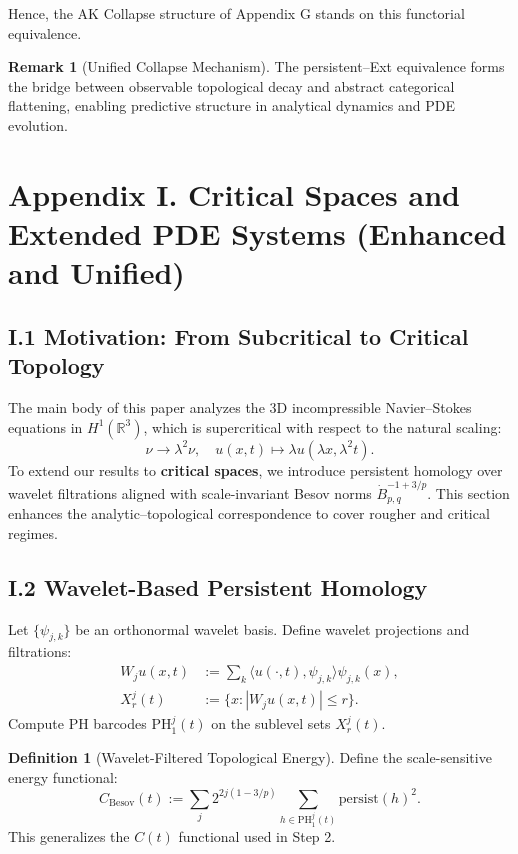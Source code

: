\documentclass[11pt]{article}
\theoremstyle{definition}
\newtheorem{definition}[theorem]{Definition}
\newtheorem{remark}[theorem]{Remark}
\begin{document}
Hence, the AK Collapse structure of Appendix G stands on this functorial equivalence.

\begin{remark}[Unified Collapse Mechanism]
The persistent–Ext equivalence forms the bridge between observable topological decay and abstract categorical flattening,  
enabling predictive structure in analytical dynamics and PDE evolution.
\end{remark}


\section*{Appendix I. Critical Spaces and Extended PDE Systems (Enhanced and Unified)}

\subsection*{I.1 Motivation: From Subcritical to Critical Topology}
The main body of this paper analyzes the 3D incompressible Navier--Stokes equations in $H^1(\mathbb{R}^3)$, which is supercritical with respect to the natural scaling:
\[
\nu \to \lambda^2 \nu, \quad u(x,t) \mapsto \lambda u(\lambda x, \lambda^2 t).
\]
To extend our results to \textbf{critical spaces}, we introduce persistent homology over wavelet filtrations aligned with scale-invariant Besov norms $\dot{B}^{-1+3/p}_{p,q}$. This section enhances the analytic--topological correspondence to cover rougher and critical regimes.

\subsection*{I.2 Wavelet-Based Persistent Homology}
Let $\{\psi_{j,k}\}$ be an orthonormal wavelet basis. Define wavelet projections and filtrations:
\begin{align*}
W_j u(x,t) &:= \sum_k \langle u(\cdot, t), \psi_{j,k} \rangle \psi_{j,k}(x), \\
X^j_r(t) &:= \{x : |W_j u(x,t)| \leq r\}.
\end{align*}
Compute PH barcodes $\mathrm{PH}^j_1(t)$ on the sublevel sets $X^j_r(t)$.

\begin{definition}[Wavelet-Filtered Topological Energy]
Define the scale-sensitive energy functional:
\[
C_{\mathrm{Besov}}(t) := \sum_j 2^{2j(1 - 3/p)} \sum_{h \in \mathrm{PH}^j_1(t)} \mathrm{persist}(h)^2.
\]
This generalizes the $C(t)$ functional used in Step 2.
\end{definition}
\end{document}
